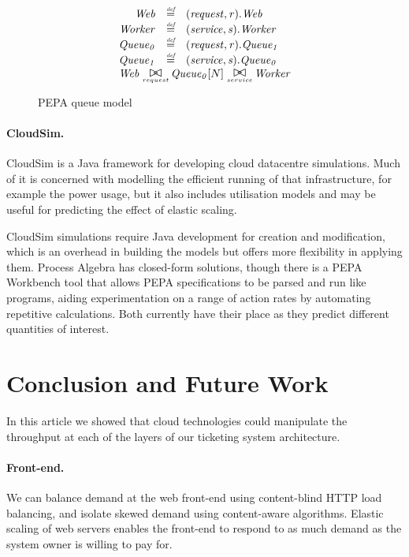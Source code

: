 \documentclass{llncs}
\begin{document}
\begin{figure}
\caption{PEPA queue model}
\centering
\begin{displaymath}
	\begin{array}{rcl}
\mathit{Web} & \rmdef & (\mathit{request},\mathit{r}).\mathit{Web}\\
		\mathit{Worker} & \rmdef & (\mathit{service},\mathit{s}).\mathit{Worker}\\
		\mathit{Queue_{0}} & \rmdef & (\mathit{request},\mathit{r}).\mathit{Queue_{1}}\\
		\mathit{Queue_{1}} & \rmdef & (\mathit{service},\mathit{s}).\mathit{Queue_{0}}\\
[0.0ex]		\multicolumn{3}{l}{\mathit{Web}\sync{request}\mathit{Queue_{0}}[N]\sync{service}\mathit{Worker}}\\
[0.0ex]	\end{array}
\end{displaymath}
\end{figure}

\paragraph{CloudSim.}  CloudSim \cite{calheiros2011cloudsim} is a Java framework for developing cloud datacentre simulations.  Much of it is concerned with modelling the efficient running of that infrastructure, for example the power usage, but it also includes utilisation models and may be useful for predicting the effect of elastic scaling.

CloudSim simulations require Java development for creation and modification, which is an overhead in building the models but offers more flexibility in applying them.  Process Algebra has closed-form solutions, though there is a PEPA Workbench tool \cite{gilmore1994pepa} that allows PEPA specifications to be parsed and run like programs, aiding experimentation on a range of action rates by automating repetitive calculations.  Both currently have their place as they predict different quantities of interest.

\section{Conclusion and Future Work}
In this article we showed that cloud technologies could manipulate the throughput at each of the layers of our ticketing system architecture.
\paragraph{Front-end.}  We can balance demand at the web front-end using content-blind HTTP load balancing, and isolate skewed demand using content-aware algorithms.  Elastic scaling of web servers enables the front-end to respond to as much demand as the system owner is willing to pay for.
\end{document}

